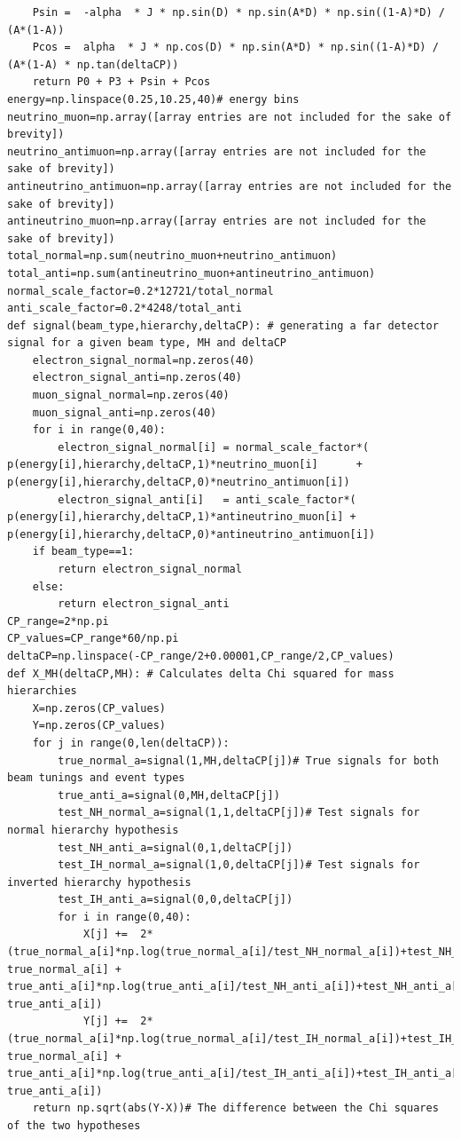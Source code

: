 \documentclass[12pt]{article}
\begin{document}
\begin{lstlisting}
	Psin =  -alpha  * J * np.sin(D) * np.sin(A*D) * np.sin((1-A)*D) / (A*(1-A))
	Pcos =  alpha  * J * np.cos(D) * np.sin(A*D) * np.sin((1-A)*D) / (A*(1-A) * np.tan(deltaCP))
	return P0 + P3 + Psin + Pcos
energy=np.linspace(0.25,10.25,40)# energy bins
neutrino_muon=np.array([array entries are not included for the sake of brevity])
neutrino_antimuon=np.array([array entries are not included for the sake of brevity])
antineutrino_antimuon=np.array([array entries are not included for the sake of brevity])
antineutrino_muon=np.array([array entries are not included for the sake of brevity])
total_normal=np.sum(neutrino_muon+neutrino_antimuon)
total_anti=np.sum(antineutrino_muon+antineutrino_antimuon)
normal_scale_factor=0.2*12721/total_normal
anti_scale_factor=0.2*4248/total_anti
def signal(beam_type,hierarchy,deltaCP): # generating a far detector signal for a given beam type, MH and deltaCP
	electron_signal_normal=np.zeros(40)
	electron_signal_anti=np.zeros(40)
	muon_signal_normal=np.zeros(40)
	muon_signal_anti=np.zeros(40)
	for i in range(0,40):
		electron_signal_normal[i] = normal_scale_factor*( p(energy[i],hierarchy,deltaCP,1)*neutrino_muon[i]      + p(energy[i],hierarchy,deltaCP,0)*neutrino_antimuon[i])
		electron_signal_anti[i]   = anti_scale_factor*( p(energy[i],hierarchy,deltaCP,1)*antineutrino_muon[i] + p(energy[i],hierarchy,deltaCP,0)*antineutrino_antimuon[i])
	if beam_type==1:
		return electron_signal_normal
	else: 
		return electron_signal_anti
CP_range=2*np.pi
CP_values=CP_range*60/np.pi
deltaCP=np.linspace(-CP_range/2+0.00001,CP_range/2,CP_values)
def X_MH(deltaCP,MH): # Calculates delta Chi squared for mass hierarchies
	X=np.zeros(CP_values)
	Y=np.zeros(CP_values)
	for j in range(0,len(deltaCP)):
		true_normal_a=signal(1,MH,deltaCP[j])# True signals for both beam tunings and event types
		true_anti_a=signal(0,MH,deltaCP[j])
		test_NH_normal_a=signal(1,1,deltaCP[j])# Test signals for normal hierarchy hypothesis
		test_NH_anti_a=signal(0,1,deltaCP[j])
		test_IH_normal_a=signal(1,0,deltaCP[j])# Test signals for inverted hierarchy hypothesis
		test_IH_anti_a=signal(0,0,deltaCP[j])
		for i in range(0,40):
			X[j] +=  2*(true_normal_a[i]*np.log(true_normal_a[i]/test_NH_normal_a[i])+test_NH_normal_a[i]-true_normal_a[i] + true_anti_a[i]*np.log(true_anti_a[i]/test_NH_anti_a[i])+test_NH_anti_a[i]-true_anti_a[i])
			Y[j] +=  2*(true_normal_a[i]*np.log(true_normal_a[i]/test_IH_normal_a[i])+test_IH_normal_a[i]-true_normal_a[i] + true_anti_a[i]*np.log(true_anti_a[i]/test_IH_anti_a[i])+test_IH_anti_a[i]-true_anti_a[i])
	return np.sqrt(abs(Y-X))# The difference between the Chi squares of the two hypotheses

\end{lstlisting}
\end{document}
